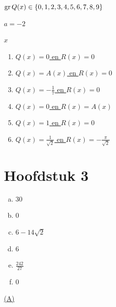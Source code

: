 \documentclass{ximera}
\begin{document}
\begin{oplossing} 
\hyperlink{oef2.17}{$\operatorname{gr} Q(x) \in \left\{0,1,2,3,4,5,6,7,8,9\right\}$}
\end{oplossing} 

\begin{oplossing} 
\hyperlink{oef2.18}{$a=-2$}
\end{oplossing} 

\begin{oplossing} 
\hyperlink{oef2.19}{$x$}
\end{oplossing} 

\begin{oplossing} 
\begin{enumerate}
\item
\hyperlink{oef2.20}{$Q(x) = 0$ en $R(x) = 0$}
\item
\hyperlink{oef2.20}{$Q(x) = A(x)$ en $R(x) = 0$}
\item
\hyperlink{oef2.20}{$Q(x) = -\frac{1}{7}$ en $R(x) = 0$}
\item
\hyperlink{oef2.20}{$Q(x) = 0$ en $R(x) = A(x)$}
\item
\hyperlink{oef2.20}{$Q(x) = 1$ en $R(x) = 0$}
\item
\hyperlink{oef2.20}{$Q(x) = \frac{1}{\sqrt{2}}$ en $R(x) =-\frac{\pi}{\sqrt{2}}$}
\end{enumerate}
\setcounter{enumi}{0}
\end{oplossing} 

\section*{Hoofdstuk 3}

\begin{oplossing} 
\begin{enumerate}[(a)]
\item
\hyperlink{oef3.1}{$30$}
\item
\hyperlink{oef3.1}{$0$}
\item
\hyperlink{oef3.1}{$6-14\sqrt{2}$}
\item
\hyperlink{oef3.1}{$6$}
\item
\hyperlink{oef3.1}{$\frac{242}{27}$}
\item
\hyperlink{oef3.1}{$0$}
\end{enumerate}
\end{oplossing} 

\begin{oplossing} 
\hyperlink{oef3.2}{(A)}
\end{oplossing} 
\end{document}
